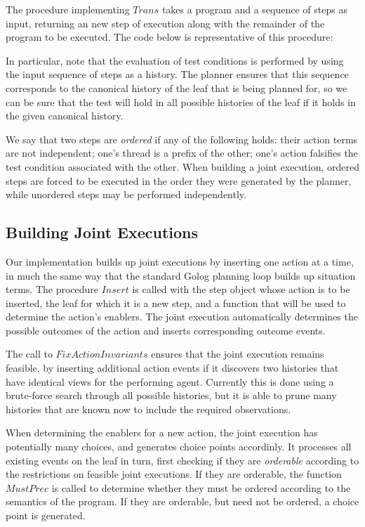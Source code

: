 The procedure implementing $Trans$ takes a program and a sequence
of steps as input, returning an new step of execution along with the
remainder of the program to be executed. The code below is representative
of this procedure:


In particular, note that the evaluation of test conditions is performed
by using the input sequence of steps as a history. The planner ensures
that this sequence corresponds to the canonical history of the leaf
that is being planned for, so we can be sure that the test will hold
in all possible histories of the leaf if it holds in the given canonical
history.

We say that two steps are \emph{ordered} if any of the following holds:
their action terms are not independent; one's thread is a prefix of
the other; one's action falsifies the test condition associated with
the other. When building a joint execution, ordered steps are forced
to be executed in the order they were generated by the planner, while
unordered steps may be performed independently.


\subsection{Building Joint Executions}

Our implementation builds up joint executions by inserting one action
at a time, in much the same way that the standard Golog planning loop
builds up situation terms. The procedure $Insert$ is called with
the step object whose action is to be inserted, the leaf for which
it is a new step, and a function that will be used to determine the
action's enablers. The joint execution automatically determines the
possible outcomes of the action and inserts corresponding outcome
events.


The call to $FixActionInvariants$ ensures that the joint execution
remains feasible, by inserting additional action events if it discovers
two histories that have identical views for the performing agent.
Currently this is done using a brute-force search through all possible
histories, but it is able to prune many histories that are known now
to include the required observations.

When determining the enablers for a new action, the joint execution
has potentially many choices, and generates choice points accordinly.
It processes all existing events on the leaf in turn, first checking
if they are \emph{orderable} according to the restrictions on feasible
joint executions. If they are orderable, the function $MustPrec$
is called to determine whether they must be ordered according to the
semantics of the program. If they are orderable, but need not be ordered,
a choice point is generated.

